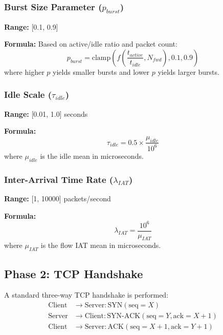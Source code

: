 \documentclass[11pt,a4paper]{article}
\begin{document}
\subsubsection{Burst Size Parameter ($p_{burst}$)}

\textbf{Range:} [0.1, 0.9]

\textbf{Formula:} Based on active/idle ratio and packet count:
\begin{equation}
p_{burst} = \text{clamp}\left(f\left(\frac{t_{active}}{t_{idle}}, N_{fwd}\right), 0.1, 0.9\right)
\end{equation}
where higher $p$ yields smaller bursts and lower $p$ yields larger bursts.

\subsubsection{Idle Scale ($\tau_{idle}$)}

\textbf{Range:} [0.01, 1.0] seconds

\textbf{Formula:}
\begin{equation}
\tau_{idle} = 0.5 \times \frac{\mu_{idle}}{10^6}
\end{equation}
where $\mu_{idle}$ is the idle mean in microseconds.

\subsubsection{Inter-Arrival Time Rate ($\lambda_{IAT}$)}

\textbf{Range:} [1, 10000] packets/second

\textbf{Formula:}
\begin{equation}
\lambda_{IAT} = \frac{10^6}{\mu_{IAT}}
\end{equation}
where $\mu_{IAT}$ is the flow IAT mean in microseconds.

\subsection{Phase 2: TCP Handshake}

A standard three-way TCP handshake is performed:
\begin{align}
\text{Client} &\rightarrow \text{Server}: \text{SYN}(\text{seq}=X) \\
\text{Server} &\rightarrow \text{Client}: \text{SYN-ACK}(\text{seq}=Y, \text{ack}=X+1) \\
\text{Client} &\rightarrow \text{Server}: \text{ACK}(\text{seq}=X+1, \text{ack}=Y+1)
\end{align}
\end{document}
